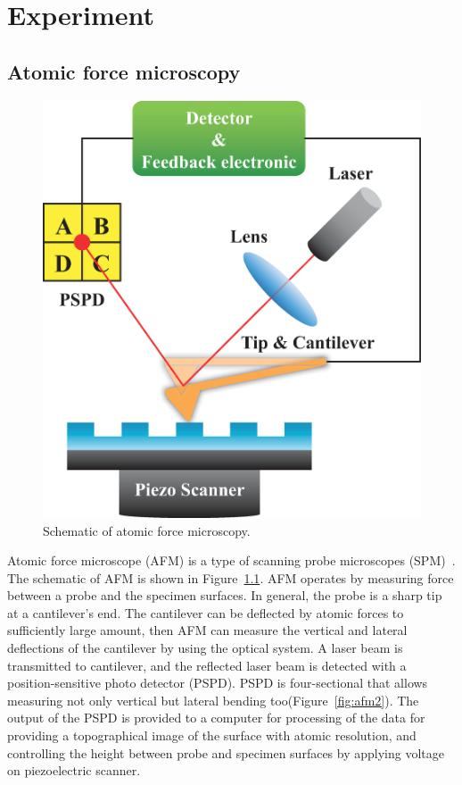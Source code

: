 \chapter{Experiment}
\label{c:exp}

\section{Atomic force microscopy}

\begin{figure}[htb]
\centering
\includegraphics[scale=0.35]{figures/afm1.eps}
\caption{\label{fig:afm1}Schematic of atomic force microscopy.}
\end{figure}
Atomic force microscope (AFM) is a type of scanning probe microscopes (SPM)~\cite{bennig1988atomic}.  The schematic of AFM is shown in Figure~\ref{fig:afm1}. AFM operates by measuring force between a probe and the specimen surfaces. In general,  the probe is a sharp tip at a cantilever's end. The cantilever can be deflected by atomic forces to sufficiently large amount, then AFM can measure the vertical and lateral deflections of the cantilever by using the optical system. A laser beam is transmitted to cantilever, and the reflected laser beam is detected with a position-sensitive photo detector (PSPD). PSPD is four-sectional that allows measuring not only vertical but lateral bending too(Figure~\ref{fig:afm2}). The output of the PSPD is provided to a computer for processing of the data for providing a topographical image of the surface with atomic resolution, and controlling the height between probe and specimen surfaces by applying voltage on piezoelectric scanner.
